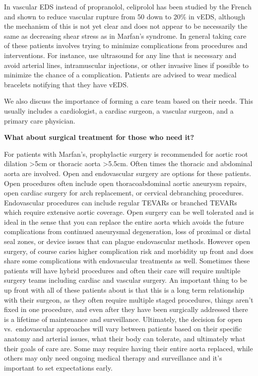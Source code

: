 \documentclass[
]{book}
\begin{document}
In vascular EDS instead of propranolol, celiprolol has been studied by
the French and shown to reduce vascular rupture from 50 down to 20\% in
vEDS, although the mechanism of this is not yet clear and does not
appear to be necessarily the same as decreasing shear stress as in
Marfan's syndrome. In general taking care of these patients involves
trying to minimize complications from procedures and interventions. For
instance, use ultrasound for any line that is necessary and avoid
arterial lines, intramuscular injections, or other invasive lines if
possible to minimize the chance of a complication. Patients are advised
to wear medical bracelets notifying that they have vEDS.

We also discuss the importance of forming a care team based on their
needs. This usually includes a cardiologist, a cardiac surgeon, a
vascular surgeon, and a primary care physician.

\textbf{What about surgical treatment for those who need it?}

For patients with Marfan's, prophylactic surgery is recommended for
aortic root dilation \textgreater5cm or thoracic aorta \textgreater5.5cm. Often times the
thoracic and abdominal aorta are involved. Open and endovascular surgery
are options for these patients. Open procedures often include open
thoracoabdominal aortic aneurysm repairs, open cardiac surgery for arch
replacement, or cervical debranching procedures. Endovascular procedures
can include regular TEVARs or branched TEVARs which require extensive
aortic coverage. Open surgery can be well tolerated and is ideal in the
sense that you can replace the entire aorta which avoids the future
complications from continued aneurysmal degeneration, loss of proximal
or distal seal zones, or device issues that can plague endovascular
methods. However open surgery, of course caries higher complication risk
and morbidity up front and does share some complications with
endovascular treatments as well. Sometimes these patients will have
hybrid procedures and often their care will require multiple surgery
teams including cardiac and vascular surgery. An important thing to be
up front with all of these patients about is that this is a long term
relationship with their surgeon, as they often require multiple staged
procedures, things aren't fixed in one procedure, and even after they
have been surgically addressed there is a lifetime of maintenance and
surveillance. Ultimately, the decision for open vs.~endovascular
approaches will vary between patients based on their specific anatomy
and arterial issues, what their body can tolerate, and ultimately what
their goals of care are.\citep{lumEndovascularProceduresPatients2012a} Some
may require having their entire aorta replaced, while others may only
need ongoing medical therapy and surveillance and it's important to set
expectations early.
\end{document}
